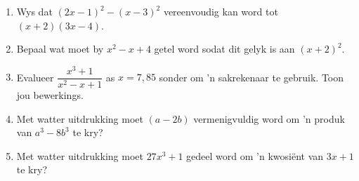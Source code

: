 \begin{eocexercises}{}
\begin{enumerate}[itemsep=5pt, label=\textbf{\arabic*}. ]
\item Wys dat ${(2x-1)}^{2}-{(x-3)}^{2}$ vereenvoudig kan word tot  $(x+2)(3x-4)$.

\item Bepaal wat moet by ${x}^{2}-x+4$ getel word sodat dit gelyk is aan ${(x+2)}^{2}$.
\item Evalueer $\dfrac{x^{3}+1}{x^{2}-x+1}$ as $x=7,85$ sonder om 'n sakrekenaar te gebruik. Toon jou bewerkings.
\item Met watter uitdrukking moet $(a-2b)$ vermenigvuldig word om 'n produk van $a^3-8b^3$ te kry?
\item Met watter uitdrukking moet $27x^3+1$ gedeel word om 'n kwosi\"ent van $3x+1$ te kry?
\end{enumerate}



\end{eocexercises}

